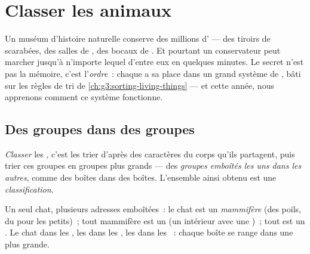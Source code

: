 \chapter{Classer les animaux}\label{ch:g4:classifying-animals}

Un muséum d'histoire naturelle conserve des millions d' ---
des tiroirs de scarabées, des salles de , des bocaux de
. Et pourtant un conservateur peut marcher jusqu'à n'importe
lequel d'entre eux en quelques minutes. Le secret n'est pas la
mémoire, c'est l'\emph{ordre}~: chaque  a sa place dans un
grand système de , bâti sur les règles de tri de
\cref{ch:g3:sorting-living-things} --- et cette année, nous
apprenons comment ce système fonctionne.

\section{Des groupes dans des groupes}

\begin{definition}[Classification]\label{def:g4:classifying-animals:classification}
\emph{Classer} les , c'est les trier
d'après des caractères du corps qu'ils partagent, puis trier ces
groupes en groupes plus grands --- des \emph{groupes emboîtés les
uns dans les autres}, comme des boîtes dans
des boîtes. L'ensemble ainsi obtenu est une
\emph{classification}.
\end{definition}

\begin{example}\label{ex:g4:classifying-animals:cat}
Un seul chat, plusieurs adresses emboîtées~: le chat est un
\emph{mammifère} (des poils, du  pour les petits)~; tout
mammifère est un \emph{} (un  intérieur avec une
)~; tout  est un \emph{}. Le chat
dans les , les  dans les , les
 dans les ~: chaque boîte se range dans une plus
grande.
\end{example}

